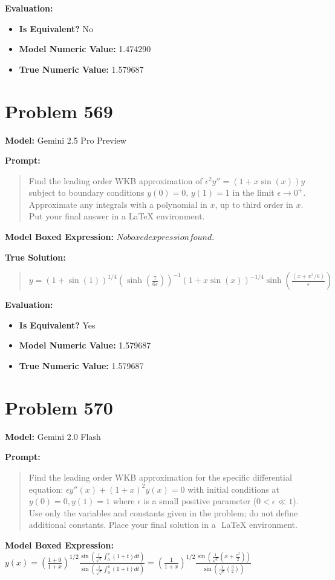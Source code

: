 \documentclass{article}
\begin{document}
\textbf{Evaluation:}
\begin{itemize}
\item \textbf{Is Equivalent?} No
\item \textbf{Model Numeric Value:} 1.474290
\item \textbf{True Numeric Value:} 1.579687
\end{itemize}
\vspace{1cm}
\section*{Problem 569}
\textbf{Model:} Gemini 2.5 Pro Preview

\textbf{Prompt:}
\begin{quote}
Find the leading order WKB approximation of $\epsilon^2 y'' = (1 + x \sin(x)) y$ subject to boundary conditions $y(0) = 0$, $y(1)= 1$ in the limit $\epsilon \rightarrow 0^+$. Approximate any integrals with a polynomial in $x$, up to third order in $x$. Put your final answer in a LaTeX \boxed{} environment.
\end{quote}
\textbf{Model Boxed Expression:} $No boxed expression found.$

\textbf{True Solution:}
\begin{quote}
$y = (1 + \sin(1))^{1/4} \left(\sinh\left(\frac{7}{6\epsilon}\right)\right)^{-1}(1 + x\sin(x))^{-1/4} \sinh\left(\frac{(x + x^3/6)}{\epsilon}\right)$
\end{quote}

\textbf{Evaluation:}
\begin{itemize}
\item \textbf{Is Equivalent?} Yes
\item \textbf{Model Numeric Value:} 1.579687
\item \textbf{True Numeric Value:} 1.579687
\end{itemize}
\vspace{1cm}
\section*{Problem 570}
\textbf{Model:} Gemini 2.0 Flash

\textbf{Prompt:}
\begin{quote}
Find the leading order WKB approximation for the specific differential equation: $\epsilon y''(x) + (1+x)^2 y(x) = 0$ with initial conditions at $ y(0) = 0, y(1) = 1$ where $\epsilon$ is a small positive parameter ($0 < \epsilon \ll 1$). Use only the variables and constants given in the problem; do not define additional constants. Place your final solution in a $\boxed{}$ LaTeX environment.
\end{quote}
\textbf{Model Boxed Expression:} $y(x) = \left(\frac{1+0}{1+x}\right)^{1/2} \frac{\sin\left(\frac{1}{\sqrt{\epsilon}}\int_0^x (1+t) dt\right)}{\sin\left(\frac{1}{\sqrt{\epsilon}}\int_0^1 (1+t) dt\right)} = \left(\frac{1}{1+x}\right)^{1/2} \frac{\sin\left(\frac{1}{\sqrt{\epsilon}}\left(x + \frac{x^2}{2}\right)\right)}{\sin\left(\frac{1}{\sqrt{\epsilon}}\left(\frac{3}{2}\right)\right)}$
\end{document}
